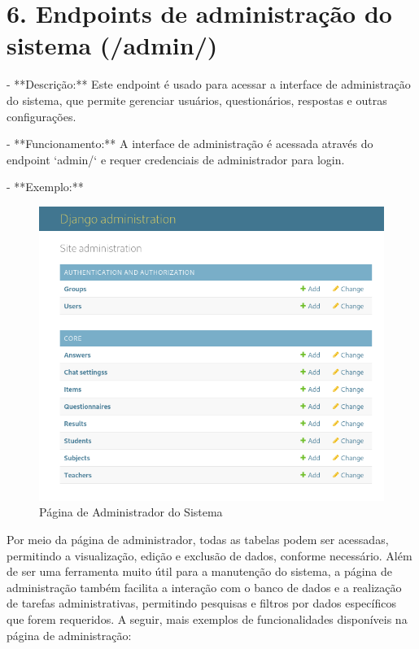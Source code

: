 \section*{6. Endpoints de administração do sistema (/admin/)}

- **Descrição:** Este endpoint é usado para acessar a interface de administração do sistema, que permite gerenciar usuários, questionários, respostas e outras configurações.

- **Funcionamento:** A interface de administração é acessada através do endpoint `admin/` e requer credenciais de administrador para login.

- **Exemplo:**

\begin{figure}[H]
    \centering
    \includegraphics[width=1\textwidth]{figuras/admin.png}
    \caption{Página de Administrador do Sistema}
    \label{fig:report_questions}
\end{figure}

Por meio da página de administrador, todas as tabelas podem ser acessadas, permitindo a visualização, edição e exclusão de dados, conforme necessário. Além de ser uma ferramenta muito útil para a manutenção do sistema, a página de administração também facilita a interação com o banco de dados e a realização de tarefas administrativas, permitindo pesquisas e filtros por dados específicos que forem requeridos. A seguir, mais exemplos de funcionalidades disponíveis na página de administração:

